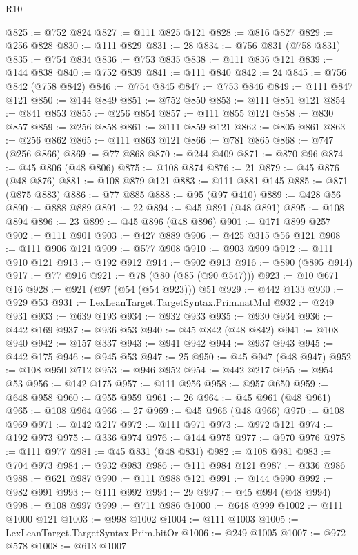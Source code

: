 \begin{lexlean}{R10}
\begin{coremodule}
@825 := @752 @824
@827 := @111 @825 @121
@828 := @816 @827
@829 := @256 @828
@830 := @111 @829
@831 := 28
@834 := @756 @831 (@758 @831)
@835 := @754 @834
@836 := @753 @835
@838 := @111 @836 @121
@839 := @144 @838
@840 := @752 @839
@841 := @111 @840
@842 := 24
@845 := @756 @842 (@758 @842)
@846 := @754 @845
@847 := @753 @846
@849 := @111 @847 @121
@850 := @144 @849
@851 := @752 @850
@853 := @111 @851 @121
@854 := @841 @853
@855 := @256 @854
@857 := @111 @855 @121
@858 := @830 @857
@859 := @256 @858
@861 := @111 @859 @121
@862 := @805 @861
@863 := @256 @862
@865 := @111 @863 @121
@866 := @781 @865
@868 := @747 (@256 @866)
@869 := @77 @868
@870 := @244 @409
@871 := @870 @96
@874 := @45 @806 (@48 @806)
@875 := @108 @874
@876 := 21
@879 := @45 @876 (@48 @876)
@881 := @108 @879 @121
@883 := @111 @881 @145
@885 := @871 (@875 @883)
@886 := @77 @885
@888 := @95 (@97 @410)
@889 := @428 @56
@890 := @888 @889
@891 := 22
@894 := @45 @891 (@48 @891)
@895 := @108 @894
@896 := 23
@899 := @45 @896 (@48 @896)
@901 := @171 @899 @257
@902 := @111 @901
@903 := @427 @889
@906 := @425 @315 @56 @121
@908 := @111 @906 @121
@909 := @577 @908
@910 := @903 @909
@912 := @111 @910 @121
@913 := @192 @912
@914 := @902 @913
@916 := @890 (@895 @914)
@917 := @77 @916
@921 := @78 (@80 (@85 (@90 @547)))
@923 := @10 @671 @16
@928 := @921 (@97 (@54 (@54 @923))) @51
@929 := @442 @133
@930 := @929 @53
@931 := LexLeanTarget.TargetSyntax.Prim.natMul
@932 := @249 @931
@933 := @639 @193
@934 := @932 @933
@935 := @930 @934
@936 := @442 @169
@937 := @936 @53
@940 := @45 @842 (@48 @842)
@941 := @108 @940
@942 := @157 @337
@943 := @941 @942
@944 := @937 @943
@945 := @442 @175
@946 := @945 @53
@947 := 25
@950 := @45 @947 (@48 @947)
@952 := @108 @950 @712
@953 := @946 @952
@954 := @442 @217
@955 := @954 @53
@956 := @142 @175
@957 := @111 @956
@958 := @957 @650
@959 := @648 @958
@960 := @955 @959
@961 := 26
@964 := @45 @961 (@48 @961)
@965 := @108 @964
@966 := 27
@969 := @45 @966 (@48 @966)
@970 := @108 @969
@971 := @142 @217
@972 := @111 @971
@973 := @972 @121
@974 := @192 @973
@975 := @336 @974
@976 := @144 @975
@977 := @970 @976
@978 := @111 @977
@981 := @45 @831 (@48 @831)
@982 := @108 @981
@983 := @704 @973
@984 := @932 @983
@986 := @111 @984 @121
@987 := @336 @986
@988 := @621 @987
@990 := @111 @988 @121
@991 := @144 @990
@992 := @982 @991
@993 := @111 @992
@994 := 29
@997 := @45 @994 (@48 @994)
@998 := @108 @997
@999 := @711 @986
@1000 := @648 @999
@1002 := @111 @1000 @121
@1003 := @998 @1002
@1004 := @111 @1003
@1005 := LexLeanTarget.TargetSyntax.Prim.bitOr
@1006 := @249 @1005
@1007 := @972 @578
@1008 := @613 @1007

\end{coremodule}
\end{lexlean}

